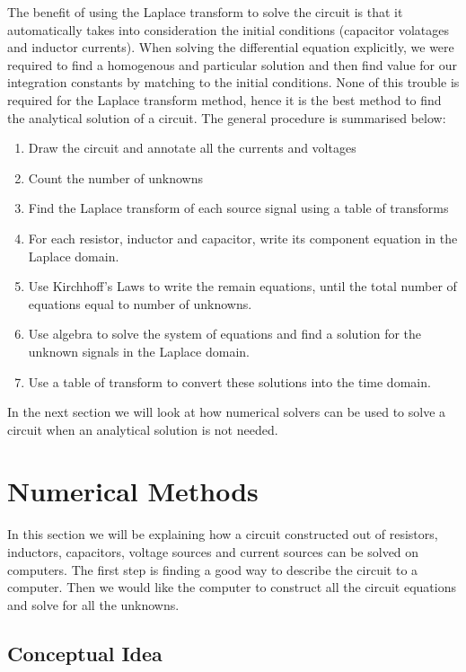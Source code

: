 \documentclass[14pt,a5paper,twoside]{book}
\begin{document}
The benefit of using the Laplace transform to solve the circuit is that it automatically takes into consideration the initial conditions (capacitor volatages and inductor currents). When solving the differential equation explicitly, we were required to find a homogenous and particular solution and then find value for our integration constants by matching to the initial conditions. None of this trouble is required for the Laplace transform method, hence it is the best method to find the analytical solution of a circuit. The general procedure is summarised below:

\begin{enumerate}
\item{Draw the circuit and annotate all the currents and voltages}
\item{Count the number of unknowns}
\item{Find the Laplace transform of each source signal using a table of transforms}
\item{For each resistor, inductor and capacitor, write its component equation in the Laplace domain.}
\item{Use Kirchhoff's Laws to write the remain equations, until the total number of equations equal to number of unknowns.}
\item{Use algebra to solve the system of equations and find a solution for the unknown signals in the Laplace domain.}
\item{Use a table of transform to convert these solutions into the time domain.}
\end{enumerate}

In the next section we will look at how numerical solvers can be used to solve a circuit when an analytical solution is not needed.

\newpage
\section{Numerical Methods}
In this section we will be explaining how a circuit constructed out of resistors, inductors, capacitors, voltage sources and current sources can be solved on computers. The first step is finding a good way to describe the circuit to a computer. Then we would like the computer to construct all the circuit equations and solve for all the unknowns.

\subsection{Conceptual Idea}
\end{document}
